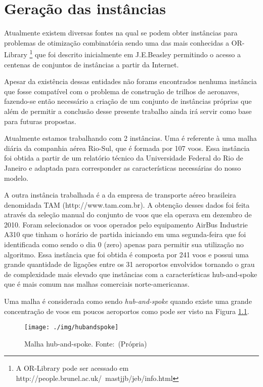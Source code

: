 \chapter{Geração das instâncias}
  
	Atualmente existem diversas fontes na qual se podem obter instâncias para
	problemas de otimização combinatória sendo uma das mais conhecidas a
	OR-Library \footnote{ A OR-Library pode ser acessado em
	http://people.brunel.ac.uk/~mastjjb/jeb/info.html} que foi descrito
	inicialmente em J.E.Beasley \cite{orlibrary} permitindo o acesso a centenas de
	conjuntos de instâncias a partir da Internet.
  
	Apesar da existência dessas entidades não forams encontrados nenhuma instância
	que fosse compatível com o problema de construção de trilhos de aeronaves,
	fazendo-se então necessário a criação de um conjunto de instâncias próprias
	que além de permitir a conclusão desse presente trabalho ainda irá servir como
	base para futuras propostas.
  
 	Atualmente estamos trabalhando com 2 instâncias. Uma é referente à uma malha
 	diária da companhia aérea Rio-Sul, que é formada por 107 voos. Essa instância
 	foi obtida a partir de um relatório técnico da Universidade Federal do Rio de
 	Janeiro \cite{pontes2002} e adaptada para corresponder as características
 	necessárias do nosso modelo.
 	 	
	A outra instância trabalhada é a da empresa de transporte aéreo brasileira
	denomidada TAM (http://www.tam.com.br). A obtenção desses  dados foi feita
	através da seleção manual do conjunto de voos que ela operava em dezembro de
	2010. Foram selecionados os voos operados pelo equipamento AirBus Industrie
	A310 que tinham o horário de partida iniciando em uma segunda-feira que foi
	identificada como sendo o dia 0 (zero) apenas para permitir sua utilização no
	algoritmo. Essa instância que foi obtida é composta por 241 voos e possui uma
	grande quantidade de ligações entre os 31 aeroportos envolvidos tornando o
	grau de complexidade mais elevado que instâncias com a características 
	hub-and-spoke que é mais comum nas malhas comerciais norte-americanas.
	
	Uma malha é considerada como sendo \textit{hub-and-spoke} quando existe uma
	grande concentração de voos em poucos aeroportos como pode ser visto na Figura
	\ref{fig:hubandspoke}.
	
\begin{figure}[ht]
\caption{Malha hub-and-spoke. \mbox{Fonte: (Própria)}}
\label{fig:hubandspoke}
\texttt{[image: ./img/hubandspoke]}
\end{figure}
  
